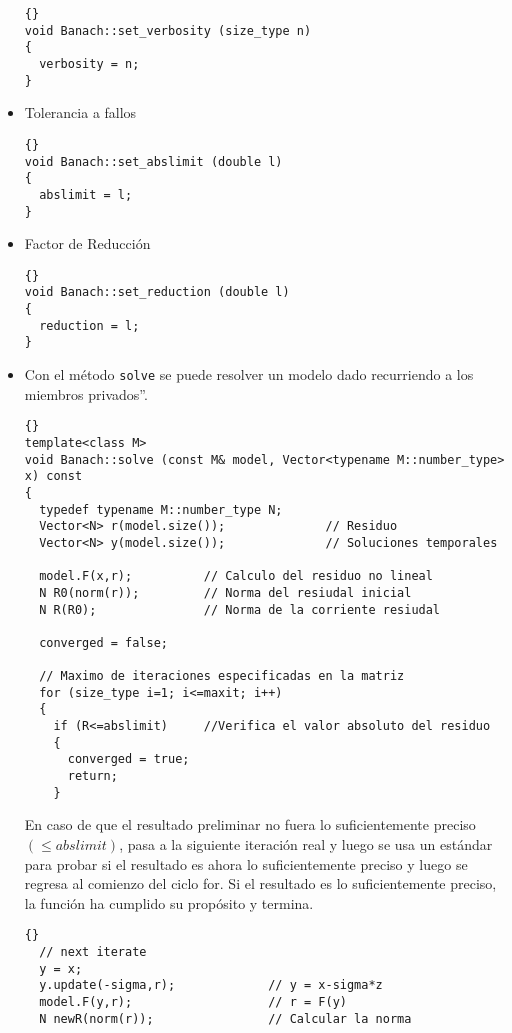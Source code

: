 \begin{itemize}
  {\footnotesize{\begin{lstlisting}{}
void Banach::set_verbosity (size_type n)
{
  verbosity = n;
}
\end{lstlisting}}}

\item Tolerancia a fallos
  {\footnotesize{\begin{lstlisting}{}
void Banach::set_abslimit (double l)
{
  abslimit = l;
}
\end{lstlisting}}}

\item Factor de Reducción 
  {\footnotesize{\begin{lstlisting}{}
void Banach::set_reduction (double l)
{
  reduction = l;
}
\end{lstlisting}}}

\item Con el método \lstinline{solve} se puede resolver un modelo dado recurriendo a los miembros privados''.

  {\footnotesize{\begin{lstlisting}{}
template<class M>
void Banach::solve (const M& model, Vector<typename M::number_type> x) const
{
  typedef typename M::number_type N;
  Vector<N> r(model.size());              // Residuo
  Vector<N> y(model.size());              // Soluciones temporales

  model.F(x,r);          // Calculo del residuo no lineal
  N R0(norm(r));         // Norma del resiudal inicial
  N R(R0);               // Norma de la corriente resiudal

  converged = false;

  // Maximo de iteraciones especificadas en la matriz 
  for (size_type i=1; i<=maxit; i++)
  {
    if (R<=abslimit)     //Verifica el valor absoluto del residuo
    {
      converged = true;
      return;
    }
  \end{lstlisting}}}

En caso de que el resultado preliminar no fuera lo suficientemente preciso $(\leqslant
abslimit)$, pasa a la siguiente iteración real y luego se usa un estándar para probar si
el resultado es ahora lo suficientemente preciso y luego se regresa al comienzo del ciclo 
for.  Si el resultado es lo suficientemente preciso, la función ha cumplido su propósito y termina.
{\footnotesize{\begin{lstlisting}{}
  // next iterate
  y = x;
  y.update(-sigma,r);             // y = x-sigma*z
  model.F(y,r);                   // r = F(y)
  N newR(norm(r));                // Calcular la norma


\end{lstlisting}}}
\end{itemize}
